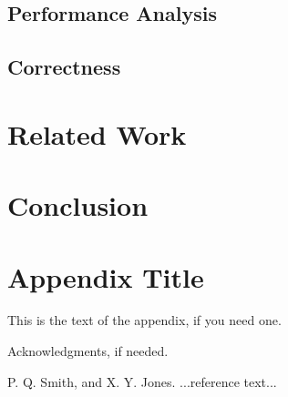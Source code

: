 \documentclass[preprint]{sigplanconf}
\begin{document}
\subsection{Performance Analysis}
\subsection{Correctness}

\section{Related Work}

\section{Conclusion}

\appendix
\section{Appendix Title}

This is the text of the appendix, if you need one.

\acks

Acknowledgments, if needed.





\begin{thebibliography}{}
\softraggedright

P. Q. Smith, and X. Y. Jones. ...reference text...

\end{thebibliography}
\end{document}

